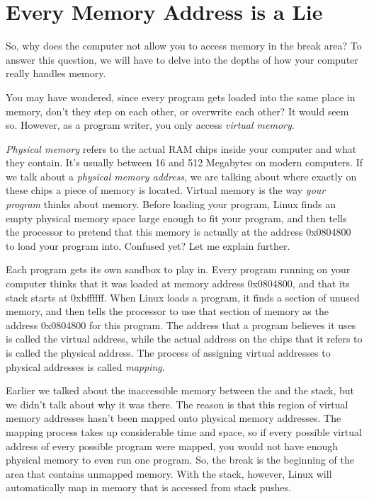 \section{Every Memory Address is a Lie}

So, why does the computer not allow you to access memory in the 
break area?  To answer this question, we will have to delve into
the depths of how your computer really handles memory.  

You may have wondered, since every program gets loaded into the same
place in memory, don't they step on each other, or overwrite each other?
It would seem so.  However, as a program writer, you only access
\emph{virtual memory}.  

\emph{Physical memory}
refers to the actual RAM chips inside your computer and what they contain.   It's usually
between 16 and 512 Megabytes on modern computers.  If we talk about a \emph{physical
memory address}, we are talking about where exactly on these
chips a piece of memory is located.  Virtual
memory is the way \emph{your program} thinks about memory.  Before loading
your program, Linux finds an empty physical memory space large enough to
fit your program, and then tells
the processor to pretend that this memory is actually at the address
0x0804800 to load your program into.  Confused yet?  Let me explain further.

Each program gets its own sandbox to play in.  Every program running
on your computer thinks that it was loaded at memory address 0x0804800,
and that its stack starts at 0xbffffff.  When Linux loads a program,
it finds a section of unused memory, and then tells the processor to use
that section of memory as the address 0x0804800 for this program.  The
address that a program believes it uses is called the 
virtual address,
while the actual address on the chips that it refers to is called
the physical address.  
The process of assigning virtual addresses to
physical addresses is called 
\emph{mapping}.  

Earlier we 
talked about the inaccessible memory between the  and the 
stack, but we didn't talk about why it was there.  The reason is that this
region of virtual memory addresses hasn't been mapped onto 
physical memory addresses.  The mapping process takes up considerable
time and space, so if every possible virtual address of every possible
program were mapped, you would not have enough physical memory to even run one program.  So,
the break is the beginning of the area that contains unmapped memory.  With the
stack, however, Linux will automatically map in memory that is accessed from
stack pushes.

